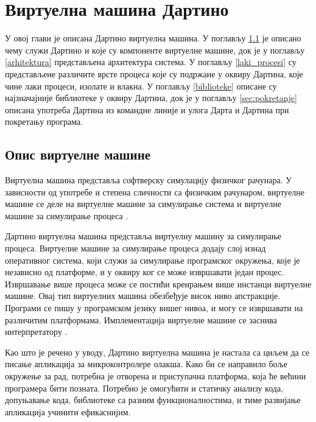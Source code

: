 \documentclass[12pt,oneside]{memoir}
\begin{document}
\chapter{Виртуелна машина Дартино}
\label{chp:dartino}
У овој глави је описана Дартино виртуелна машина. У поглављу \ref{sec:opis} је описано чему служи Дартино и које су компоненте виртуелне машине, док је у поглављу \ref{arhitektura} представљена архитектура система. У поглављу \ref{laki_procesi} су представљене различите врсте процеса које су подржане у оквиру Дартина, које чине лаки процеси, изолате и влакна. У поглављу \ref{biblioteke} описане су најзначајније библиотеке у оквиру Дартина, док је у поглављу \ref{sec:pokretanje} описана употреба Дартина из командне линије и улога Дарта и Дартина при покретању програма.
\section{Опис виртуелне машине}
\label{sec:opis}

Виртуелна машина представља софтверску симулацију физичког рачунара. У зависности од употребе и степена сличности са физичким рачунаром, виртуелне машине се деле на виртуелне машине за симулирање система и виртуелне машине за симулирање процеса \cite{virtuelna_masina}.

Дартино виртуелна машина представља виртуелну машину за симулирање процеса. Виртуелне машине за симулирање процеса додају слој изнад оперативног система, који служи за симулирање програмског окружења, које је независно од платформе, и у оквиру ког се може извршавати један процес. Извршавање више процеса може се постићи креирањем више инстанци виртуелне машине. Овај тип виртуелних машина обезбеђује висок ниво апстракције. Програми се пишу у програмском језику вишег нивоа, и могу се извршавати на различитим платформама. Имплементација виртуелне машине се заснива интерпретатору \cite{virtuelna_masina}.

Као што је речено у уводу, Дартино виртуелна машина је настала са циљем да се писање апликација за микроконтролере олакша. Како би се направило боље окружење за рад, потребна је отворена и приступачна платформа, која ће већини програмера бити позната. Потребно је омогућити и статичку анализу кода, допуњавање кода, библиотеке са разним функционалностима, и тиме развијање апликација учинити ефикаснијим.
\end{document}
